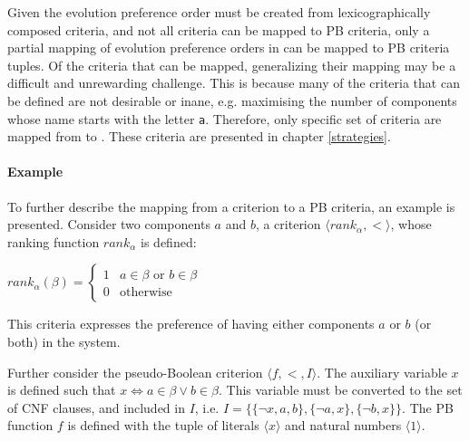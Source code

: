 Given the evolution preference order must be created from lexicographically composed criteria,
and not all criteria can be mapped to PB criteria, only a partial mapping of evolution preference orders in \modelname can be mapped to PB criteria tuples.
Of the criteria that can be mapped, generalizing their mapping may be a difficult and unrewarding challenge.
This is because many of the criteria that can be defined are not desirable or inane, e.g. maximising the number of components whose name starts with the letter \texttt{a}.
Therefore, only specific set of criteria are mapped from \modelname to \modelimpl.
These criteria are presented in chapter \ref{strategies}. 


\paragraph{Example}
To further describe the mapping from a criterion to a PB criteria, an example is presented.
Consider two components $a$ and $b$, a criterion $\langle rank_{\alpha},< \rangle$, whose ranking function $rank_{\alpha}$ is defined:

$rank_{\alpha}(\beta) = \begin{cases} 1 & a \in \beta \text{ or } b \in \beta\\ 0 & \text{otherwise} \end{cases}$

This criteria expresses the preference of having either components $a$ or $b$ (or both) in the system.

Further consider the pseudo-Boolean criterion $\langle f, < , I \rangle$.
The auxiliary variable $x$ is defined such that $x \Leftrightarrow a \in \beta \vee b \in \beta$.
This variable must be  converted to the set of CNF clauses, and included in $I$,
i.e. $I = \{\{\neg x, a,b\}, \{\neg a,x\}, \{\neg b, x \}\}$.
The PB function $f$ is defined with the tuple of literals $\langle x \rangle$ and natural numbers $\langle 1 \rangle$.

